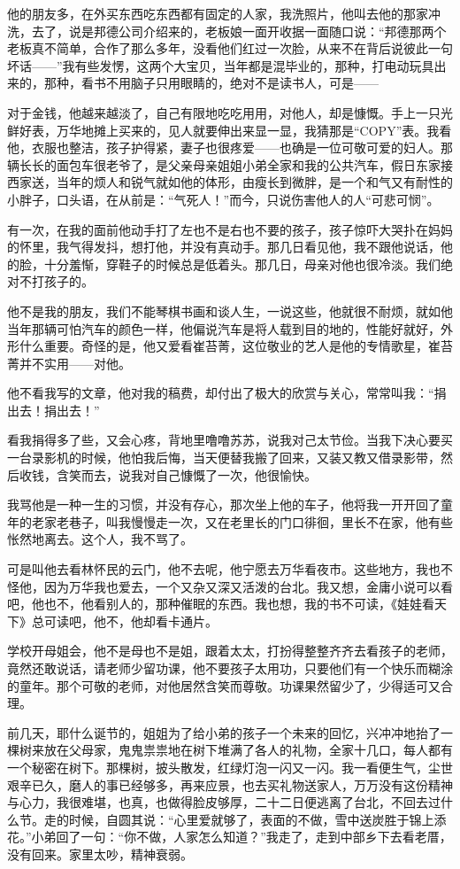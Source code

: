 \par 他的朋友多，在外买东西吃东西都有固定的人家，我洗照片，他叫去他的那家冲洗，去了，说是邦德公司介绍来的，老板娘一面开收据一面随口说：“邦德那两个老板真不简单，合作了那么多年，没看他们红过一次脸，从来不在背后说彼此一句坏话——”我有些发愣，这两个大宝贝，当年都是混毕业的，那种，打电动玩具出来的，那种，看书不用脑子只用眼睛的，绝对不是读书人，可是——
\par 对于金钱，他越来越淡了，自己有限地吃吃用用，对他人，却是慷慨。手上一只光鲜好表，万华地摊上买来的，见人就要伸出来显一显，我猜那是“COPY”表。我看他，衣服也整洁，孩子护得紧，妻子也很疼爱——也确是一位可敬可爱的妇人。那辆长长的面包车很老爷了，是父亲母亲姐姐小弟全家和我的公共汽车，假日东家接西家送，当年的烦人和锐气就如他的体形，由瘦长到微胖，是一个和气又有耐性的小胖子，口头语，在从前是：“气死人！”而今，只说伤害他人的人“可悲可悯”。
\par 有一次，在我的面前他动手打了左也不是右也不要的孩子，孩子惊吓大哭扑在妈妈的怀里，我气得发抖，想打他，并没有真动手。那几日看见他，我不跟他说话，他的脸，十分羞惭，穿鞋子的时候总是低着头。那几日，母亲对他也很冷淡。我们绝对不打孩子的。
\par 他不是我的朋友，我们不能琴棋书画和谈人生，一说这些，他就很不耐烦，就如他当年那辆可怕汽车的颜色一样，他偏说汽车是将人载到目的地的，性能好就好，外形什么重要。奇怪的是，他又爱看崔苔菁，这位敬业的艺人是他的专情歌星，崔苔菁并不实用——对他。
\par 他不看我写的文章，他对我的稿费，却付出了极大的欣赏与关心，常常叫我：“捐出去！捐出去！”
\par 看我捐得多了些，又会心疼，背地里噜噜苏苏，说我对己太节俭。当我下决心要买一台录影机的时候，他怕我后悔，当天便替我搬了回来，又装又教又借录影带，然后收钱，含笑而去，说我对自己慷慨了一次，他很愉快。
\par 我骂他是一种一生的习惯，并没有存心，那次坐上他的车子，他将我一开开回了童年的老家老巷子，叫我慢慢走一次，又在老里长的门口徘徊，里长不在家，他有些怅然地离去。这个人，我不骂了。
\par 可是叫他去看林怀民的云门，他不去呢，他宁愿去万华看夜市。这些地方，我也不怪他，因为万华我也爱去，一个又杂又深又活泼的台北。我又想，金庸小说可以看吧，他也不，他看别人的，那种催眠的东西。我也想，我的书不可读，《娃娃看天下》总可读吧，他不，他却看卡通片。
\par 学校开母姐会，他不是母也不是姐，跟着太太，打扮得整整齐齐去看孩子的老师，竟然还敢说话，请老师少留功课，他不要孩子太用功，只要他们有一个快乐而糊涂的童年。那个可敬的老师，对他居然含笑而尊敬。功课果然留少了，少得适可又合理。
\par 前几天，耶什么诞节的，姐姐为了给小弟的孩子一个未来的回忆，兴冲冲地抬了一棵树来放在父母家，鬼鬼祟祟地在树下堆满了各人的礼物，全家十几口，每人都有一个秘密在树下。那棵树，披头散发，红绿灯泡一闪又一闪。我一看便生气，尘世艰辛已久，磨人的事已经够多，再来应景，也去买礼物送家人，万万没有这份精神与心力，我很难堪，也真，也做得脸皮够厚，二十二日便逃离了台北，不回去过什么节。走的时候，自圆其说：“心里爱就够了，表面的不做，雪中送炭胜于锦上添花。”小弟回了一句：“你不做，人家怎么知道？”我走了，走到中部乡下去看老厝，没有回来。家里太吵，精神衰弱。
